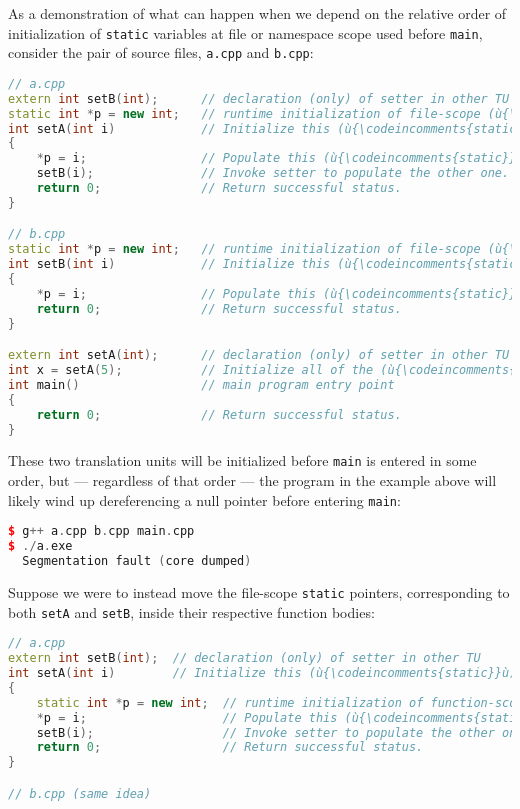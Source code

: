 As a demonstration of what can happen when we depend on the relative
order of initialization of \lstinline!static! variables at file or
namespace scope used before \lstinline!main!, consider the
 pair of source files, \lstinline!a.cpp! and
\lstinline!b.cpp!:

\begin{lstlisting}[language=C++]
// a.cpp
extern int setB(int);      // declaration (only) of setter in other TU
static int *p = new int;   // runtime initialization of file-scope (ù{\codeincomments{static}}ù)
int setA(int i)            // Initialize this (ù{\codeincomments{static}}ù) variable; then that one.
{
    *p = i;                // Populate this (ù{\codeincomments{static}}ù)-owned heap memory.
    setB(i);               // Invoke setter to populate the other one.
    return 0;              // Return successful status.
}

// b.cpp
static int *p = new int;   // runtime initialization of file-scope (ù{\codeincomments{static}}ù)
int setB(int i)            // Initialize this (ù{\codeincomments{static}}ù) variable.
{
    *p = i;                // Populate this (ù{\codeincomments{static}}ù)-owned heap memory.
    return 0;              // Return successful status.
}

extern int setA(int);      // declaration (only) of setter in other TU
int x = setA(5);           // Initialize all of the (ù{\codeincomments{static}}ù) variables.
int main()                 // main program entry point
{
    return 0;              // Return successful status.
}
\end{lstlisting}
    
\noindent These two translation units will be initialized before \lstinline!main! is
entered in some order, but --- regardless of that order --- the program
in the example above will likely wind up dereferencing a null pointer
before entering \lstinline!main!:

\begin{lstlisting}[language=C++]
$ g++ a.cpp b.cpp main.cpp
$ ./a.exe
  Segmentation fault (core dumped)
\end{lstlisting}
    
\noindent Suppose we were to instead move the file-scope \lstinline!static! pointers,
corresponding to both \lstinline!setA! and \lstinline!setB!, inside their
respective function bodies:

\begin{lstlisting}[language=C++]
// a.cpp
extern int setB(int);  // declaration (only) of setter in other TU
int setA(int i)        // Initialize this (ù{\codeincomments{static}}ù) variable; then that one.
{
    static int *p = new int;  // runtime initialization of function-scope (ù{\codeincomments{static}}ù)
    *p = i;                   // Populate this (ù{\codeincomments{static}}ù)-owned heap memory.
    setB(i);                  // Invoke setter to populate the other one.
    return 0;                 // Return successful status.
}

// b.cpp (same idea)
\end{lstlisting}
    
